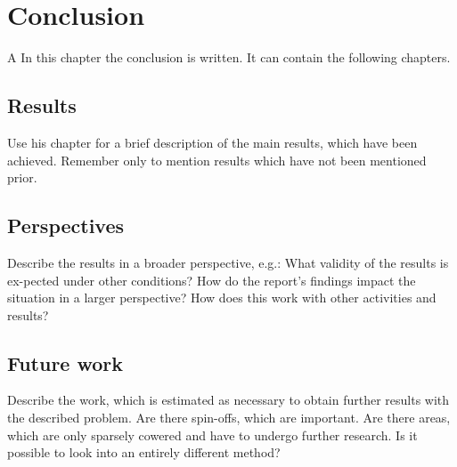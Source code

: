 \chapter{Conclusion}
A In this chapter the conclusion is written. It can contain the following chapters.

\section{Results}
Use his chapter for a brief description of the main results, which have been achieved. Remember only to mention results which have not been mentioned prior. 


\section{Perspectives}
Describe the results in a broader perspective, e.g.: What validity of the results is ex-pected under other conditions? How do the report's findings impact the situation in a larger perspective? How does this work with other activities and results?


\section{Future work}
Describe the work, which is estimated as necessary to obtain further results with the described problem. Are there spin-offs, which are important. Are there areas, which are only sparsely cowered and have to undergo further research. Is it possible to look into an entirely different method?


